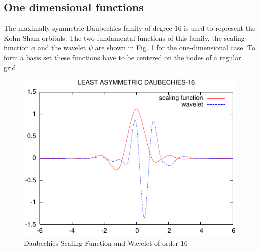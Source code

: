 \documentclass[a4paper,11pt]{report}
\begin{document}
\subsection{One dimensional functions}
The maximally symmetric Daubechies family of degree 16 is used to represent 
the Kohn-Sham orbitals. The two fundamental functions of this family, 
the scaling function $\phi$ and the wavelet $\psi$ are shown in Fig. \ref{sym_16} 
for the one-dimensional case.
To form a basis set these functions have to be centered on the nodes of a regular grid.
\begin{figure}[ht]
\begin{center}
\includegraphics[width=\textwidth]{sym_16.pdf}
\end{center}
\label{sym_16}
\caption{Daubechies Scaling Function and Wavelet of order 16}
\end{figure}
\end{document}
